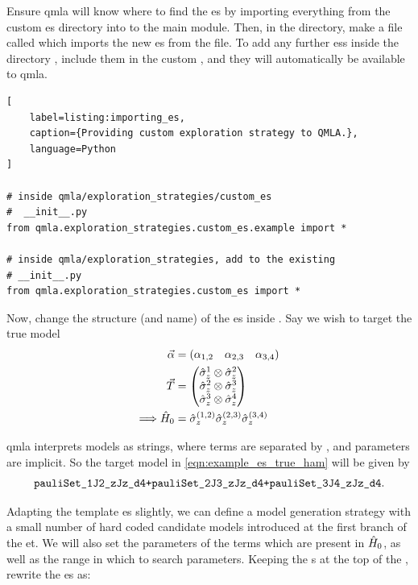 Ensure \gls{qmla} will know where to find the \gls{es} by importing everything from the custom \gls{es} 
    directory into to the main  module. 
Then, in the  directory, make a file called  which imports the new \gls{es}
    from the  file. 
To add any further \glspl{es} inside the directory , include them in the custom ,
    and they will automatically be available to \gls{qmla}.

\begin{lstlisting}[
    label=listing:importing_es,
    caption={Providing custom exploration strategy to QMLA.},
    language=Python
]

# inside qmla/exploration_strategies/custom_es
#  __init__.py    
from qmla.exploration_strategies.custom_es.example import *

# inside qmla/exploration_strategies, add to the existing
# __init__.py 
from qmla.exploration_strategies.custom_es import *

\end{lstlisting}

Now, change the structure (and name) of the \gls{es} inside . 
Say we wish to target the \gls{true model} 
\begin{equation}
    \label{eqn:example_es_true_ham}
    \begin{split}
        \vec{\alpha} &= \begin{matrix}( \alpha_{1,2} & \alpha_{2,3} & \alpha_{3,4})\end{matrix} \\
        { \vec{T} } &= \left(\begin{matrix} \hat{\sigma}_{z}^1 \otimes \hat{\sigma}_{z}^2 \\ \hat{\sigma}_{z}^2 \otimes \hat{\sigma}_{z}^3  \\ \hat{\sigma}_{z}^3 \otimes \hat{\sigma}_{z}^4 \end{matrix}\right) \\
        \Longrightarrow \hat{H}_0 &= \hat{\sigma}_{z}^{(1,2)} \hat{\sigma}_{z}^{(2,3)} \hat{\sigma}_{z}^{(3,4)} \\
    \end{split}
\end{equation}

\gls{qmla} interprets models as strings, where terms are separated by \ttt{+}, and parameters are implicit. 
So the target model in \cref{eqn:example_es_true_ham} will be given by 
$$ \texttt{pauliSet\_1J2\_zJz\_d4+pauliSet\_2J3\_zJz\_d4+pauliSet\_3J4\_zJz\_d4}. $$

Adapting the template \gls{es} slightly, we can define a model generation strategy with a small number of hard coded 
    candidate models introduced at the first branch of the \acrlong{et}. 
We will also set the parameters of the terms which are present in $\hat{H}_0$, as well as the range in which to search parameters.
Keeping the s at the top of the , rewrite the \gls{es} as: 

